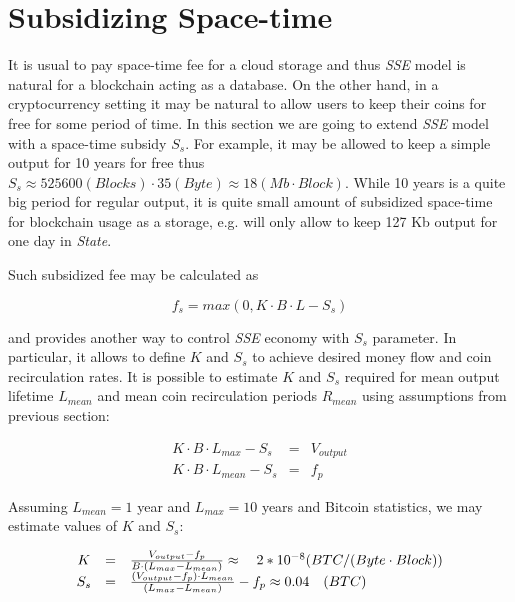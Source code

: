 \documentclass[]{llncs}   %
\newcommand{\authnote}[2]{\marginpar{\parbox{\marginparwidth}{\tiny %
  \textsf{#1 {\textcolor{blue}{notes: #2}}}}}%
  \textcolor{blue}{\textbf{\dag}}}
\newcommand{\authnote}[2]{
  \textsf{#1 \textcolor{blue}{: #2}}}
\newcommand{\authnote}[2]{}
\newcommand{\knote}[1]{{\authnote{\textcolor{green}{Alex notes}}{#1}}}
\newcommand{\esse}{\textit{SSE}}
\newcommand{\state}{\textit{State}}
\begin{document}
\section{Subsidizing Space-time}
\label{sec:subsidy}

\knote{the whole section is not very clear}

It is usual to pay space-time fee for a cloud storage and thus \esse{} model is natural for a blockchain acting as a database. On the other hand, in a cryptocurrency setting it may be natural to allow users to keep their coins for free for some period of time. In this section we are going to extend \esse{} model with a space-time subsidy $S_s$. For example, it may be allowed to keep a simple output for 10 years for free thus $S_s \approx 525600 (Blocks) \cdot 35 (Byte) \approx 18 (Mb \cdot Block)$. While 10 years is a quite big period for regular output, it is quite small amount of subsidized space-time for blockchain usage as a storage, e.g. will only allow to keep 127 Kb output for one day in \state{}.

Such subsidized fee may be calculated as

\begin{equation}
f_{s} = max(0, K \cdot B \cdot L - S_s)
\end{equation}

and provides another way to control \esse{} economy with $S_s$ parameter. In particular, it allows to define $K$ and $S_s$ to achieve desired money flow and coin recirculation rates. It is possible to estimate $K$ and $S_s$ required for mean output lifetime $L_{mean}$ and mean coin recirculation periods $R_{mean}$ using assumptions from previous section:

\begin{equation}
  \begin{array}{ccl}
   K \cdot B \cdot L_{max} - S_s & = & V_{output} \\
   K \cdot B \cdot L_{mean} - S_s & = & f_p
  \end{array}
\end{equation}

Assuming $L_{mean}=1$ year and $L_{max}=10$ years and Bitcoin statistics, we may estimate values of $K$ and $S_s$:

\begin{equation}
  \begin{array}{ccl}
   K & = & {V_{output} - f_p \over B \cdot (L_{max} - L_{mean})} \approx \quad 2*10^{-8} ({BTC / (Byte \cdot Block)}) \\
   S_s & = & {(V_{output} - f_p) \cdot L_{mean} \over (L_{max} - L_{mean})} - f_p \approx 0.04\quad(BTC)
  \end{array}
\end{equation}
\end{document}
